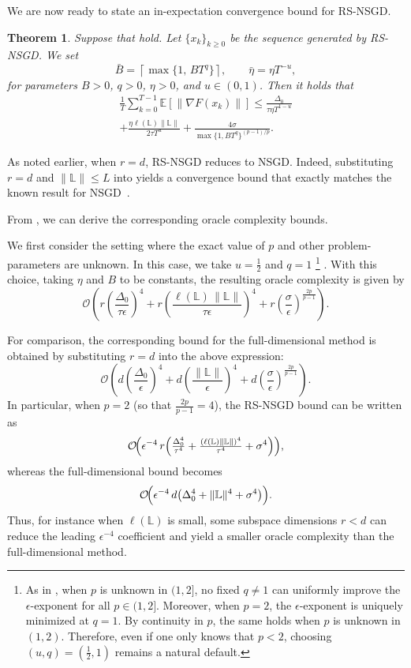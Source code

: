 \documentclass[10pt]{article}
\newtheorem{theorem}{Theorem}[section]
\begin{document}
We are now ready to state an in-expectation convergence bound for RS-NSGD.
\begin{theorem}\label{Lsmoothrnsgd}
Suppose that  hold.
Let $\{x_k\}_{k\ge 0}$ be the sequence generated by RS-NSGD.
We set
\[
\bar{B} = \left\lceil \max\{1,\, B T^q\} \right\rceil,
\qquad
\bar{\eta} = \eta T^{-u},
\]
for parameters $B > 0$, $q > 0$, $\eta > 0$, and $u \in (0,1)$.
Then it holds that
\begin{align*}
\frac{1}{T} \sum_{k=0}^{T-1} \mathbb{E}[\|\nabla F(x_k)\|]
\le
\frac{\Delta_0}{\tau \eta T^{1-u}}
\\ + \frac{\eta \ell(\mathbb{L})\|\mathbb{L}\|}{2\tau T^u}
+ \frac{4\sigma}{\max\{1,BT^q\}^{(p-1)/p}}.
\end{align*}
\end{theorem}
As noted earlier, when $r = d$, RS-NSGD reduces to NSGD. Indeed, substituting
$r=d$ and $\|\mathbb{L}\|\le L$ into  yields a convergence bound that exactly matches the known result for NSGD~\citep{huebler2025}.

From , we can derive the corresponding oracle complexity bounds.

We first consider the setting where the exact value of $p$ and other problem-parameters are unknown.
In this case, we take $u=\tfrac{1}{2}$ and $q=1$
\footnote{
As in \cite{huebler2025}, when $p$ is unknown in $(1,2]$, no fixed $q\neq 1$ can uniformly improve the $\epsilon$-exponent for all $p\in(1,2]$.
Moreover, when $p=2$, the $\epsilon$-exponent is uniquely minimized at $q=1$. By continuity in $p$, the same  holds when $p$ is unknown in $(1,2)$.
Therefore, even if one only knows that $p<2$, 
choosing $(u,q)=(\tfrac12,1)$ remains a natural default.
}
.
With this choice, taking $\eta$ and $B$ to be constants,
the resulting oracle complexity is given by
\[
\mathcal{O}\!\left(
r\left(\frac{\Delta_0}{\tau \epsilon}\right)^{4}
+
r\left(\frac{\ell(\mathbb{L})\,\|\mathbb{L}\|}{\tau \epsilon}\right)^{4}
+
r\left(\frac{\sigma}{\epsilon}\right)^{\frac{2p}{p-1}}
\right).
\]

For comparison, the corresponding bound for the full-dimensional method is obtained by substituting $r=d$ into the above expression:
\[
\mathcal{O}\!\left(
d\left(\frac{\Delta_0}{\epsilon}\right)^{4}
+
d\left(\frac{\|\mathbb{L}\|}{\epsilon}\right)^{4}
+
d\left(\frac{\sigma}{\epsilon}\right)^{\frac{2p}{p-1}}
\right).
\]
In particular, when $p=2$ (so that $\frac{2p}{p-1}=4$), the RS-NSGD bound can be written as
\[
\mathcal{O}\!\Bigl(
\epsilon^{-4}\, r\Bigl(\tfrac{\Delta_0^{4}}{\tau^{4}}
+\tfrac{(\ell(\mathbb{L})\|\mathbb{L}\|)^{4}}{\tau^{4}}
+\sigma^{4}\Bigr)
\Bigr),
\]
whereas the full-dimensional bound becomes
\[
\mathcal{O}\!\Bigl(
\epsilon^{-4}\, d\bigl(\Delta_0^{4}+\|\mathbb{L}\|^{4}+\sigma^{4}\bigr)
\Bigr).
\]
Thus, for instance when $\ell(\mathbb{L})$ is small, some subspace dimensions $r<d$ can reduce the leading $\epsilon^{-4}$ coefficient and yield a smaller oracle complexity than the full-dimensional method.
\end{document}
